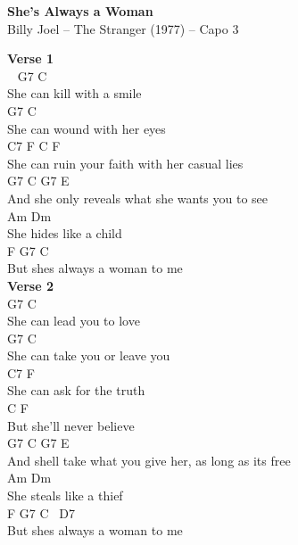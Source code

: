 \documentclass[a4paper]{article}
\begin{document}
    \begin{center}
        \textbf{She's Always a Woman}
        ~\\
        Billy Joel -- The Stranger (1977)
         -- Capo 3
    \end{center}
    {
        \scriptsize
        \textbf{Verse 1}
        ~\\
        {
            \cutive
            \obeyspaces
       ~ G7          C
\\
She can kill with a smile
\\
         G7             C
\\
She can wound with her eyes
\\
         C7         F             C       F
\\
She can ruin your faith with her casual lies
\\
         G7       C             G7          E
\\
And she only reveals what she wants you to see
\\
     Am             Dm
\\
She hides like a child
\\
           F        G7     C
\\
But shes always a woman to me
\\

        }
        \textbf{Verse 2}
        ~\\
        {
            \cutive
            \obeyspaces
          G7          C
\\
She can lead you to love
\\
         G7            C
\\
She can take you or leave you
\\
         C7           F
\\
She can ask for the truth
\\
           C        F
\\
But she'll never believe
\\
          G7              C             G7         E
\\
And shell take what you give her, as long as its free
\\
      Am           Dm
\\
She steals like a thief
\\
          F         G7      C   ~D7
\\
But shes always a woman to me
\\

}}
\end{document}
